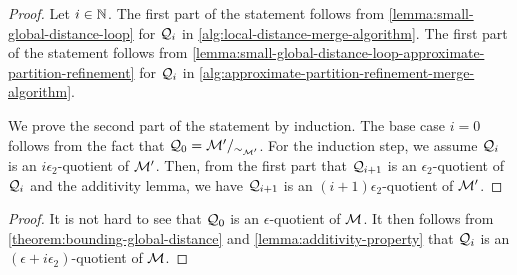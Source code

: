 \theoremBoundGlobalDistanceApproximatePartitionRefinement*
\begin{proof}
	Let $i \in \mathbb{N}$. The first part of the statement follows from \cref{lemma:small-global-distance-loop} for $\mathcal{Q}_i$ in \cref{alg:local-distance-merge-algorithm}. The first part of the statement follows from \cref{lemma:small-global-distance-loop-approximate-partition-refinement} for $\mathcal{Q}_i$ in \cref{alg:approximate-partition-refinement-merge-algorithm}. %
	
	We prove the second part of the statement by induction. The base case $i = 0$ follows from the fact that $\mathcal{Q}_0 = \mathcal{M}' /_{\sim_{\mathcal{M}'}}$. For the induction step, we assume $\mathcal{Q}_{i}$ is an $i\epsilon_2$-quotient of $\mathcal{M}'$. Then, from the first part that $\mathcal{Q}_{i+1}$ is an $\epsilon_2$-quotient of $\mathcal{Q}_{i}$ and the additivity lemma, we have $\mathcal{Q}_{i+1}$ is an $(i+1)\epsilon_2$-quotient of $\mathcal{M}'$.
\end{proof}

\corollaryBoundQuotientError*
\begin{proof}
	It is not hard to see that $\mathcal{Q}_0$ is an $\epsilon$-quotient of $\mathcal{M}$. It then follows from \cref{theorem:bounding-global-distance} and \cref{lemma:additivity-property} that $\mathcal{Q}_i$ is an $(\epsilon+i\epsilon_2)$-quotient of $\mathcal{M}$.
\end{proof}

